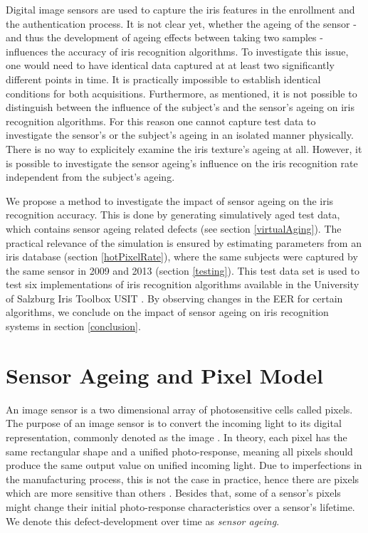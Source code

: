 \documentclass[10pt,twocolumn,letterpaper]{article}
\begin{document}
Digital image sensors are used to capture the iris features in the enrollment and the authentication process. It is not clear yet, whether the ageing of the sensor - and thus the development of ageing effects between taking two samples - influences the accuracy of iris recognition algorithms. To investigate this issue, one would need to have identical data captured at at least two significantly different points in time. It is practically impossible to establish identical conditions for both acquisitions. Furthermore, as mentioned, it is not possible to distinguish between the influence of the subject's and the sensor's ageing on iris recognition algorithms. For this reason one cannot capture test data to investigate the sensor's or the subject's ageing in an isolated manner physically. There is no way to explicitely examine the iris texture's ageing at all. However, it is possible to investigate the sensor ageing's influence on the iris recognition rate independent from the subject's ageing.

We propose a method to investigate the impact of sensor ageing on the iris recognition accuracy. This is done by generating simulatively aged test data, which contains sensor ageing related defects
(see section \ref{virtualAging}). The practical relevance of the simulation is ensured by estimating parameters from an iris database (section \ref{hotPixelRate}), where the same subjects were captured by the same sensor in 2009 and 2013 (section \ref{testing}). This test data set is used to test six implementations of iris recognition algorithms available in the University of Salzburg Iris Toolbox USIT \cite{rathgeb}. By observing changes in the EER for certain algorithms, we conclude on the impact of sensor ageing on iris recognition systems in section \ref{conclusion}.


\section{Sensor Ageing and Pixel Model}
\label{sec:ageingAndPixelModel}
An image sensor is a two dimensional array of photosensitive cells called pixels. The purpose of an image sensor is to convert the incoming light to its digital representation, commonly denoted as the image \cite{imageSensors}. In theory, each pixel has the same rectangular shape and a unified photo-response, meaning all pixels should produce the same output value on unified incoming light. Due to imperfections in the manufacturing process, this is not the case in practice, hence there are pixels which are more sensitive than others \cite{camAndDisplays}. Besides that, some of a sensor's pixels might change their initial photo-response characteristics over a sensor's lifetime. We denote this defect-development over time as \emph{sensor ageing}.
\end{document}
